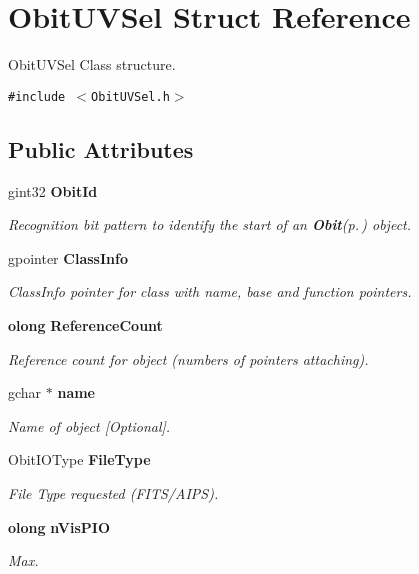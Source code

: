 \section{Obit\-UVSel Struct Reference}
\label{structObitUVSel}
Obit\-UVSel Class structure.  


{\tt \#include $<$Obit\-UVSel.h$>$}

\subsection*{Public Attributes}
\begin{CompactItemize}
\item 
gint32 {\bf Obit\-Id}
\begin{CompactList}\small\item\em Recognition bit pattern to identify the start of an {\bf Obit}{\rm (p.\,\pageref{structObit})} object. \item\end{CompactList}\item 
gpointer {\bf Class\-Info}
\begin{CompactList}\small\item\em Class\-Info pointer for class with name, base and function pointers. \item\end{CompactList}\item 
{\bf olong} {\bf Reference\-Count}
\begin{CompactList}\small\item\em Reference count for object (numbers of pointers attaching). \item\end{CompactList}\item 
gchar $\ast$ {\bf name}
\begin{CompactList}\small\item\em Name of object [Optional]. \item\end{CompactList}\item 
Obit\-IOType {\bf File\-Type}
\begin{CompactList}\small\item\em File Type requested (FITS/AIPS). \item\end{CompactList}\item 
{\bf olong} {\bf n\-Vis\-PIO}
\begin{CompactList}\small\item\em Max. \item\end{CompactList}\item 

\end{CompactItemize}
